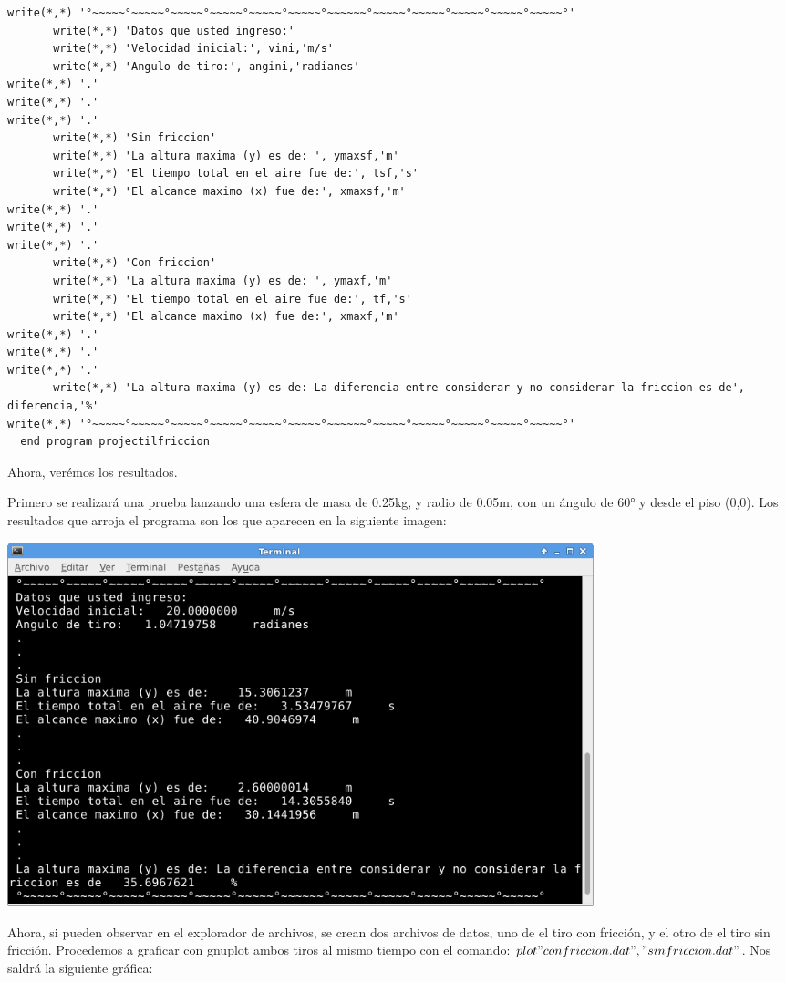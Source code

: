 \documentclass[12pt]{article}
\begin{document}
\begin{verbatim}
write(*,*) '°~~~~~°~~~~~°~~~~~°~~~~~°~~~~~°~~~~~°~~~~~~°~~~~~°~~~~~°~~~~~°~~~~~°~~~~~°'
       write(*,*) 'Datos que usted ingreso:'
       write(*,*) 'Velocidad inicial:', vini,'m/s'
       write(*,*) 'Angulo de tiro:', angini,'radianes'
write(*,*) '.'
write(*,*) '.'
write(*,*) '.'
       write(*,*) 'Sin friccion'
       write(*,*) 'La altura maxima (y) es de: ', ymaxsf,'m'
       write(*,*) 'El tiempo total en el aire fue de:', tsf,'s'
       write(*,*) 'El alcance maximo (x) fue de:', xmaxsf,'m'
write(*,*) '.'
write(*,*) '.'
write(*,*) '.'
       write(*,*) 'Con friccion'
       write(*,*) 'La altura maxima (y) es de: ', ymaxf,'m'
       write(*,*) 'El tiempo total en el aire fue de:', tf,'s'
       write(*,*) 'El alcance maximo (x) fue de:', xmaxf,'m'
write(*,*) '.'
write(*,*) '.'
write(*,*) '.'
       write(*,*) 'La altura maxima (y) es de: La diferencia entre considerar y no considerar la friccion es de', diferencia,'%'
write(*,*) '°~~~~~°~~~~~°~~~~~°~~~~~°~~~~~°~~~~~°~~~~~~°~~~~~°~~~~~°~~~~~°~~~~~°~~~~~°'
  end program projectilfriccion 

\end{verbatim}

Ahora, verémos los resultados.

Primero se realizará una prueba lanzando una esfera de masa de 0.25kg, y radio de 0.05m, con un ángulo de 60° y desde el piso (0,0).
Los resultados que arroja el programa son los que aparecen en la siguiente imagen:


\begin{center}
\includegraphics[width=17cm]{resul60.png}\\
\end{center}

Ahora, si pueden observar en el explorador de archivos, se crean dos archivos de datos, uno de el tiro con fricción, y el otro de el tiro sin fricción. Procedemos a graficar con gnuplot ambos tiros al mismo tiempo con el comando: $plot "confriccion.dat", "sinfriccion.dat"$. Nos saldrá la siguiente gráfica:
\end{document}
